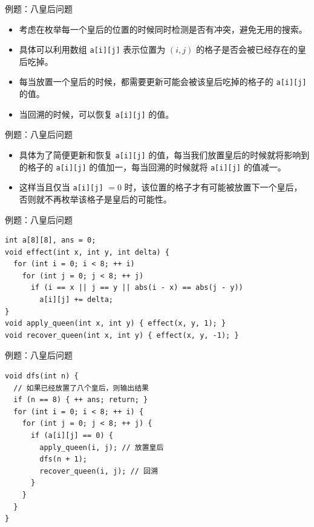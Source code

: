 \documentclass[12pt,aspectratio=169]{beamer}
\begin{document}
\begin{frame}[fragile]{例题：八皇后问题}
  \begin{itemize}
    \item 考虑在枚举每一个皇后的位置的时候同时检测是否有冲突，避免无用的搜索。\pause
    \item 具体可以利用数组 \verb|a[i][j]| 表示位置为 $(i,j)$ 的格子是否会被已经存在的皇后吃掉。\pause
    \item 每当放置一个皇后的时候，都需要更新可能会被该皇后吃掉的格子的 \verb|a[i][j]| 的值。\pause
    \item 当回溯的时候，可以恢复 \verb|a[i][j]| 的值。
  \end{itemize}
\end{frame}

\begin{frame}[fragile]{例题：八皇后问题}
  \begin{itemize}
    \item 具体为了简便更新和恢复 \verb|a[i][j]| 的值，每当我们放置皇后的时候就将影响到的格子的 \verb|a[i][j]| 的值加一，每当回溯的时候就将 \verb|a[i][j]| 的值减一。\pause
    \item 这样当且仅当 \verb|a[i][j]| $ = 0$ 时，该位置的格子才有可能被放置下一个皇后，否则就不再枚举该格子是皇后的可能性。
  \end{itemize}
\end{frame}

\begin{frame}[fragile]{例题：八皇后问题}
  \begin{verbatim}
int a[8][8], ans = 0;
void effect(int x, int y, int delta) {
  for (int i = 0; i < 8; ++ i)
    for (int j = 0; j < 8; ++ j)
      if (i == x || j == y || abs(i - x) == abs(j - y))
        a[i][j] += delta;
}
void apply_queen(int x, int y) { effect(x, y, 1); }
void recover_queen(int x, int y) { effect(x, y, -1); }
  \end{verbatim}
\end{frame}

\begin{frame}[fragile]{例题：八皇后问题}
  \begin{verbatim}
void dfs(int n) {
  // 如果已经放置了八个皇后，则输出结果
  if (n == 8) { ++ ans; return; }
  for (int i = 0; i < 8; ++ i) {
    for (int j = 0; j < 8; ++ j) {
      if (a[i][j] == 0) {
        apply_queen(i, j); // 放置皇后
        dfs(n + 1);
        recover_queen(i, j); // 回溯
      }
    }
  }
}
  \end{verbatim}
\end{frame}
\end{document}
